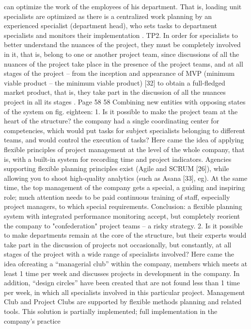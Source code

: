 can optimize the work of the employees of his department. That is, loading
unit specialists are optimized as there is a centralized
work planning by an experienced specialist (department head), who
sets tasks to department specialists and monitors their implementation .
TP2. In order for specialists to better understand the nuances of the project, they must be
completely involved in it, that is, belong to one or another project team,
since discussions of all the nuances of the project take place in the presence of the project
teams, and at all stages of the project -- from the inception and appearance of MVP (minimum
viable product -- the minimum viable product) [32] to obtain a full-fledged
market product, that is, they take part in the discussion of all the nuances
project in all its stages .
Page 58
58
Combining new entities with opposing states of the system on
fig. eighteen:
1. Is it possible to make the project team at the heart of the structure?
the company had a single coordinating center for competencies, which would put
tasks for subject specialists belonging to different teams, and
would control the execution of tasks?
Here came the idea of ​​applying flexible principles of project management at the level of
the whole company, that is, with a built-in system for recording time and project indicators.
Agencies supporting flexible planning principles exist (Agile and SCRUM
[26]), while allowing you to shoot high-quality analytics (such as Asana [33],
eg). At the same time, the top management of the company gets a special,
a guiding and inspiring role; much attention needs to be paid
continuous training of staff, especially project managers, to which
special requirements.
Conclusion: a flexible planning system with integrated performance monitoring
accept, but completely reorient the company to "confederation"
project teams -- a risky strategy.
2. Is it possible to make departments remain at the core of the structure, but their
experts would take part in the discussion of projects not occasionally, but
constantly, at all stages of the project with a wide range of
specialists involved?
Here came the idea of ​​creating a “managerial club” within the company, members
which meets at least 1 time per week and discusses projects in
development in the company. In addition, “design circles” have been created that are not found
less than 1 time per week, in which all specialists involved in
this particular project.
Management Club and Project Clubs are supported by flexible methods
planning and related tools.
This solution is partially implemented; full implementation in the company's practice
